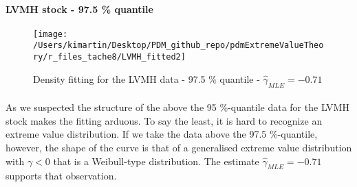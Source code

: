 \paragraph{LVMH stock - 97.5 \% quantile}
\begin{figure}[h!]
	\centering
	\texttt{[image: /Users/kimartin/Desktop/PDM\_github\_repo/pdmExtremeValueTheory/r\_files\_tache8/LVMH\_fitted2]}
	\caption{Density fitting for the LVMH data - 97.5 \% quantile - $\hat{\gamma}_{MLE} = -0.71$\\}
	\label{fig:dataAboveThresholdLVMHFitted}
\end{figure}
\paragraph{}
As we suspected the structure of the above the 95 \%-quantile data for the LVMH stock makes the fitting arduous. To say the least, it is hard to recognize an extreme value distribution. If we take the data above the 97.5 \%-quantile, however, the shape of the curve is that of a generalised extreme value distribution with $\gamma < 0$ that is a Weibull-type distribution. The estimate $\hat{\gamma}_{MLE} = -0.71$ supports that observation.
